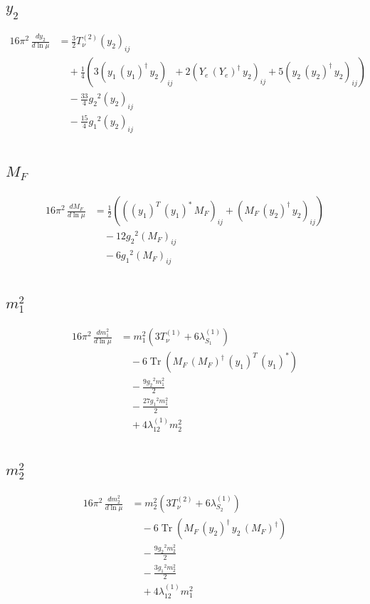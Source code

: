 \documentclass[10pt,a4paper]{article}
\begin{document}
\subsection*{$y_2$}
\begin{align*}
16\pi^2\,\frac{d y_2}{d\ln\mu} &=\frac{3}{2} T_{\nu}^{(2)} \left({y_2}\right)_{ij} \\
&\quad +\frac{1}{4} (3 \left({y_1}\,\left({y_1}\right)^{\dagger}\,{y_2}\right)_{ij}+2 \left({Y_e}\,\left({Y_e}\right)^{\dagger}\,{y_2}\right)_{ij}+5 \left({y_2}\,\left({y_2}\right)^{\dagger}\,{y_2}\right)_{ij}) \\
&\quad -\frac{33}{4} {g_2}^2 \left({y_2}\right)_{ij} \\
&\quad -\frac{15}{4} {g_1}^2 \left({y_2}\right)_{ij} \\
\end{align*}
\subsection*{$M_F$}
\begin{align*}
16\pi^2\,\frac{d M_F}{d\ln\mu} &=\frac{1}{2} (\left(\left({y_1}\right)^{T}\,\left({y_1}\right)^{*}\,{M_F}\right)_{ij}+\left({M_F}\,\left({y_2}\right)^{\dagger}\,{y_2}\right)_{ij}) \\
&\quad -12 {g_2}^2 \left({M_F}\right)_{ij} \\
&\quad -6 {g_1}^2 \left({M_F}\right)_{ij} \\
\end{align*}
\subsection*{$m_1^2$}
\begin{align*}
16\pi^2\,\frac{d m_1^2}{d\ln\mu} &={m_1^2} (3 T_{\nu}^{(1)}+6 {\lambda_{S_1}^{(1)}}) \\
&\quad -6 \operatorname{Tr}\!\left({M_F}\,\left({M_F}\right)^{\dagger}\,\left({y_1}\right)^{T}\,\left({y_1}\right)^{*}\right) \\
&\quad -\frac{9 {g_2}^2 {m_1^2}}{2} \\
&\quad -\frac{27 {g_1}^2 {m_1^2}}{2} \\
&\quad +4 {\lambda_{12}^{(1)}} {m_2^2} \\
\end{align*}
\subsection*{$m_2^2$}
\begin{align*}
16\pi^2\,\frac{d m_2^2}{d\ln\mu} &={m_2^2} (3 T_{\nu}^{(2)}+6 {\lambda_{S_2}^{(1)}}) \\
&\quad -6 \operatorname{Tr}\!\left({M_F}\,\left({y_2}\right)^{\dagger}\,{y_2}\,\left({M_F}\right)^{\dagger}\right) \\
&\quad -\frac{9 {g_2}^2 {m_2^2}}{2} \\
&\quad -\frac{3 {g_1}^2 {m_2^2}}{2} \\
&\quad +4 {\lambda_{12}^{(1)}} {m_1^2} \\
\end{align*}
\end{document}
